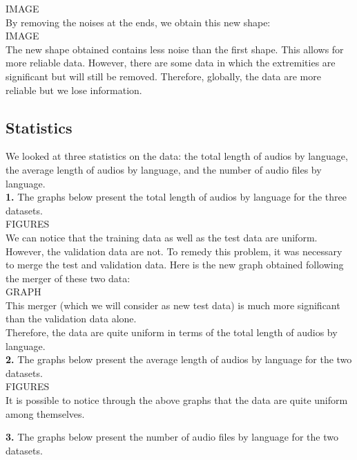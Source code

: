 \documentclass[11pt]{article}
\begin{document}
IMAGE\\

By removing the noises at the ends, we obtain this new shape:\\

IMAGE\\

The new shape obtained contains less noise than the first shape. This allows for more reliable data. However, there are some data in which the extremities are significant but will still be removed. Therefore, globally, the data are more reliable but we lose information.

\subsection{Statistics}
We looked at three statistics on the data: the total length of audios by language, the average length of audios by language, and the number of audio files by language.\\

\textbf{1.} The graphs below present the total length of audios by language for the three datasets.\\

FIGURES\\

We can notice that the training data as well as the test data are uniform. However, the validation data are not. To remedy this problem, it was necessary to merge the test and validation data. Here is the new graph obtained following the merger of these two data:\\

GRAPH\\

This merger (which we will consider as new test data) is much more significant than the validation data alone.\\
Therefore, the data are quite uniform in terms of the total length of audios by language.\\

\textbf{2.} The graphs below present the average length of audios by language for the two datasets.\\

FIGURES\\

It is possible to notice through the above graphs that the data are quite uniform among themselves.

\textbf{3.} The graphs below present the number of audio files by language for the two datasets.\\
\end{document}
